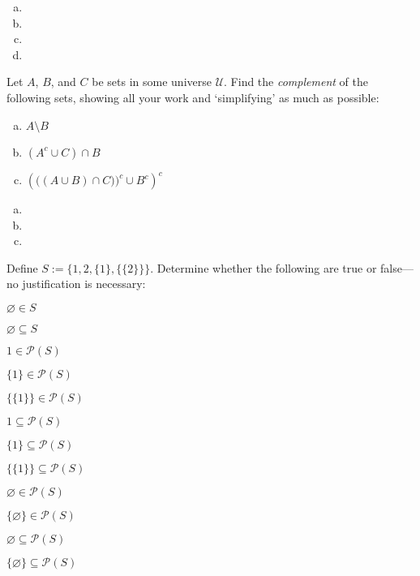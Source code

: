\documentclass[11pt,letterpaper]{article}
\begin{document}
\sol
\begin{enumerate}[(a)]
\item 
\item 
\item 
\item 
\end{enumerate}



\newpage



 Let $A$, $B$, and $C$ be sets in some universe $\mathcal{U}$. Find the \textit{complement} of the following sets, showing all your work and `simplifying' as much as possible:
	\begin{enumerate}[(a)]
	\item $A \setminus B$
	\item $(A^c \cup C) \cap B$
	\item $\left( \big( (A \cup B) \cap C) \big)^c \cup B^c \right)^c$
	\end{enumerate} \pspace

\sol
\begin{enumerate}[(a)]
\item 
\item 
\item 
\end{enumerate}



\newpage



 Define $S:= \{ 1, 2, \{ 1 \}, \{ \{ 2 \} \} \}$. Determine whether the following are true or false---no justification is necessary:
	\begin{2enumerate}
	\item $\varnothing \in S$
	\item $\varnothing \subseteq S$
	\item $1 \in \mathcal{P}(S)$
	\item $\{ 1 \} \in \mathcal{P}(S)$
	\item $\{ \{ 1 \} \} \in \mathcal{P}(S)$
	\item $1 \subseteq \mathcal{P}(S)$
	\item $\{ 1 \} \subseteq \mathcal{P}(S)$
	\item $\{ \{ 1 \} \} \subseteq \mathcal{P}(S)$
	\item $\varnothing \in \mathcal{P}(S)$
	\item $\{ \varnothing \} \in \mathcal{P}(S)$
	\item $\varnothing \subseteq \mathcal{P}(S)$
	\item $\{ \varnothing \} \subseteq \mathcal{P}(S)$
	\end{2enumerate} \pspace
\end{document}
